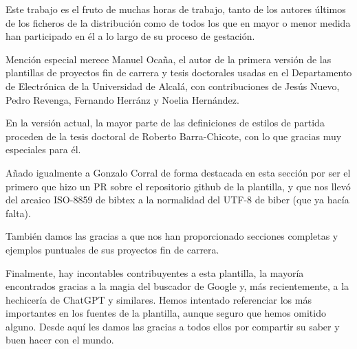 Este trabajo es el fruto de muchas horas de trabajo, tanto de los autores últimos de los ficheros de la distribución como de todos los que en mayor o menor medida han participado en él a lo largo de su proceso de gestación.

Mención especial merece Manuel Ocaña, el autor de la primera versión de las plantillas de proyectos fin de carrera y tesis doctorales usadas en el Departamento de Electrónica de la Universidad de Alcalá, con contribuciones de Jesús Nuevo, Pedro Revenga, Fernando Herránz y Noelia Hernández.

En la versión actual, la mayor parte de las definiciones de estilos de partida proceden de la tesis doctoral de Roberto Barra-Chicote, con lo que gracias muy especiales para él.

Añado igualmente a Gonzalo Corral de forma destacada en esta sección por ser el primero que hizo un PR sobre el repositorio github de la plantilla, y que nos llevó del arcaico ISO-8859 de bibtex a la normalidad del UTF-8 de biber (que ya hacía falta).

También damos las gracias a  que nos han proporcionado secciones completas y ejemplos puntuales de sus proyectos fin de carrera.

Finalmente, hay incontables contribuyentes a esta plantilla, la mayoría encontrados gracias a la magia del buscador de Google y, más recientemente, a la hechicería de ChatGPT y similares. Hemos intentado referenciar los más importantes en los fuentes de la plantilla, aunque seguro que hemos omitido alguno. Desde aquí les damos las gracias a todos ellos por compartir su saber y buen hacer con el mundo.





